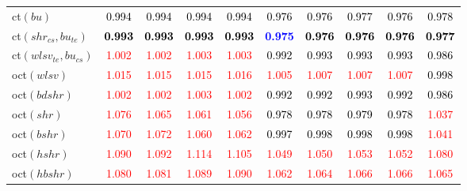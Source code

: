 \begin{tabular}[t]{l|ccccccccc}
ct$(bu)$ & \textcolor{black}{0.994} & \textcolor{black}{0.994} & \textcolor{black}{0.994} & \textcolor{black}{0.994} & \textcolor{black}{0.976} & \textcolor{black}{0.976} & \textcolor{black}{0.977} & \textcolor{black}{0.976} & \textcolor{black}{0.978}\\
ct$(shr_{cs}, bu_{te})$ & \textcolor{black}{\textbf{0.993}} & \textcolor{black}{\textbf{0.993}} & \textcolor{black}{\textbf{0.993}} & \textcolor{black}{\textbf{0.993}} & \textcolor{blue}{\textbf{0.975}} & \textcolor{black}{\textbf{0.976}} & \textcolor{black}{\textbf{0.976}} & \textcolor{black}{\textbf{0.976}} & \textcolor{black}{\textbf{0.977}}\\
ct$(wlsv_{te}, bu_{cs})$ & \textcolor{red}{1.002} & \textcolor{red}{1.002} & \textcolor{red}{1.003} & \textcolor{red}{1.003} & \textcolor{black}{0.992} & \textcolor{black}{0.993} & \textcolor{black}{0.993} & \textcolor{black}{0.993} & \textcolor{black}{0.986}\\
oct$(wlsv)$ & \textcolor{red}{1.015} & \textcolor{red}{1.015} & \textcolor{red}{1.015} & \textcolor{red}{1.016} & \textcolor{red}{1.005} & \textcolor{red}{1.007} & \textcolor{red}{1.007} & \textcolor{red}{1.007} & \textcolor{black}{0.998}\\
oct$(bdshr)$ & \textcolor{red}{1.002} & \textcolor{red}{1.002} & \textcolor{red}{1.003} & \textcolor{red}{1.002} & \textcolor{black}{0.992} & \textcolor{black}{0.992} & \textcolor{black}{0.993} & \textcolor{black}{0.992} & \textcolor{black}{0.986}\\
oct$(shr)$ & \textcolor{red}{1.076} & \textcolor{red}{1.065} & \textcolor{red}{1.061} & \textcolor{red}{1.056} & \textcolor{black}{0.978} & \textcolor{black}{0.978} & \textcolor{black}{0.979} & \textcolor{black}{0.978} & \textcolor{red}{1.037}\\
oct$(bshr)$ & \textcolor{red}{1.070} & \textcolor{red}{1.072} & \textcolor{red}{1.060} & \textcolor{red}{1.062} & \textcolor{black}{0.997} & \textcolor{black}{0.998} & \textcolor{black}{0.998} & \textcolor{black}{0.998} & \textcolor{red}{1.041}\\
oct$(hshr)$ & \textcolor{red}{1.090} & \textcolor{red}{1.092} & \textcolor{red}{1.114} & \textcolor{red}{1.105} & \textcolor{red}{1.049} & \textcolor{red}{1.050} & \textcolor{red}{1.053} & \textcolor{red}{1.052} & \textcolor{red}{1.080}\\
oct$(hbshr)$ & \textcolor{red}{1.080} & \textcolor{red}{1.081} & \textcolor{red}{1.089} & \textcolor{red}{1.090} & \textcolor{red}{1.062} & \textcolor{red}{1.064} & \textcolor{red}{1.066} & \textcolor{red}{1.066} & \textcolor{red}{1.065}\\

\end{tabular}
